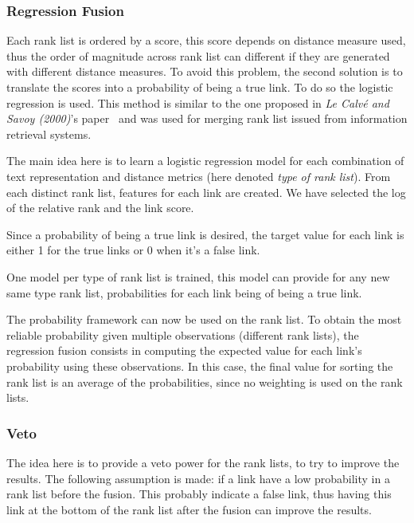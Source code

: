 \subsubsection{Regression Fusion \label{sec:regression_fusion}}

Each rank list is ordered by a score, this score depends on distance measure used, thus the order of magnitude across rank list can different if they are generated with different distance measures.
To avoid this problem, the second solution is to translate the scores into a probability of being a true link.
To do so the logistic regression is used.
This method is similar to the one proposed in \textit{Le Calvé and Savoy (2000)}'s paper~\cite{le_calve_database_merging} and was used for merging rank list issued from information retrieval systems.

The main idea here is to learn a logistic regression model for each combination of text representation and distance metrics (here denoted \textit{type of rank list}).
From each distinct rank list, features for each link are created.
We have selected the log of the relative rank and the link score.

Since a probability of being a true link is desired, the target value for each link is either 1 for the true links or 0 when it's a false link.

One model per type of rank list is trained, this model can provide for any new same type rank list, probabilities for each link being of being a true link.

The probability framework can now be used on the rank list.
To obtain the most reliable probability given multiple observations (different rank lists), the regression fusion consists in computing the expected value for each link's probability using these observations.
In this case, the final value for sorting the rank list is an average of the probabilities, since no weighting is used on the rank lists.

\subsubsection{Veto}

The idea here is to provide a veto power for the rank lists, to try to improve the results.
The following assumption is made: if a link have a low probability in a rank list before the fusion.
This probably indicate a false link, thus having this link at the bottom of the rank list after the fusion can improve the results.

